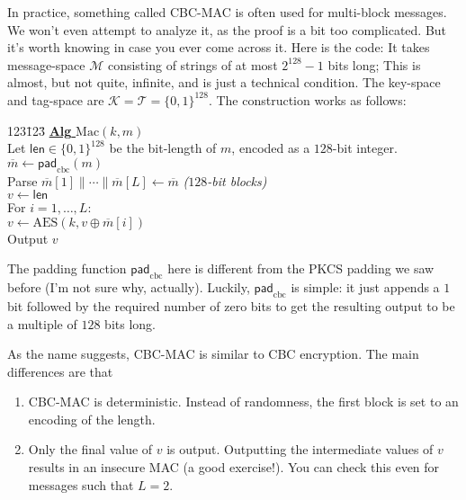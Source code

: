 \documentclass[11pt]{article}
\newcommand{\msgs}{\mathcal{M}}
\newcommand{\keys}{\mathcal{K}}
\newcommand{\MAC}{\mathrm{Mac}}
\newcommand{\tags}{\mathcal{T}}
\newcommand{\leng}{\mathsf{len}}
\newcommand{\algorithm}[1]{\textbf{Alg} {#1}}
\newcommand{\bits}{\{0,1\}}
\newcommand{\barm}{\overline{m}}
\newcommand{\aes}{\mathrm{AES}}
\newcommand{\cbcmacpad}{\mathsf{pad}_{\mathrm{cbc}}}
\begin{document}
In practice, something called CBC-MAC is often used for multi-block messages.
We won't even attempt to analyze it, as the proof is a bit too complicated. But
it's worth knowing in case you ever come across it. Here is the code: It takes
message-space $\msgs$ consisting of strings of at most $2^{128}-1$ bits long;
This is almost, but not quite, infinite, and is just a technical condition. The
key-space and tag-space are $\keys=\tags=\bits^{128}$. The construction works
as follows:
\begin{center}
        \begin{minipage}{2in}\begin{tabbing}
            123\=123\=\kill
            \underline{\algorithm{$\MAC(k,m)$}} \\[2pt]
            \> Let $\leng\in\bits^{128}$ be the bit-length of $m$, encoded
            as a $128$-bit integer.\\
            \> $\barm \gets \cbcmacpad(m)$\\
            \> Parse $\barm[1]\|\cdots\|\barm[L]\gets\barm$  \emph{($128$-bit
            blocks)}\\
            \> $v \gets \leng$ \\
            \> For $i=1,\ldots,L$: \\
            \> \> $v \gets \aes(k,v\oplus\barm[i])$\\
            \> Output $v$
        \end{tabbing}\end{minipage}
    \end{center}
The padding function $\cbcmacpad$ here is different from the PKCS padding we
saw before (I'm not sure why, actually). Luckily, $\cbcmacpad$ is simple:
it just appends a $1$ bit followed by the required number of zero bits to
get the resulting output to be a multiple of $128$ bits long.

As the name suggests,
CBC-MAC is similar to CBC encryption. The main differences are that 
\begin{enumerate}

    \item CBC-MAC is  deterministic. Instead of randomness, the first
        block is set to an encoding of the length.

    \item Only the final value of $v$ is output. Outputting the intermediate
        values of $v$ results in an insecure MAC (a good exercise!). You can
        check this even for messages such that $L=2$.

\end{enumerate}
\end{document}
